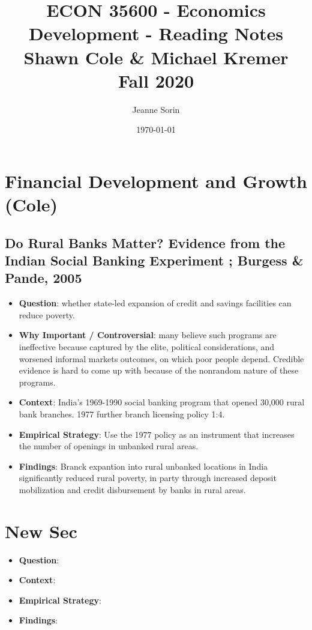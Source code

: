 \documentclass[10pt, final]{article}
\title{ECON 35600 - Economics Development - Reading Notes \\ Shawn Cole \& Michael Kremer \\ Fall 2020}
\author{Jeanne Sorin}
\date{\today}
\begin{document}
\newcommand{\hatxi}{\hat{\mathbf{x}}^i}
\newcommand{\tildexi}{\tilde{\mathbf{x}}^i}

\maketitle

\section{Financial Development and Growth (Cole)} %
\label{sec:financial_development_and_growth_}

\subsection{Do Rural Banks Matter? Evidence from the Indian Social Banking Experiment ; Burgess \& Pande, 2005} %
\label{sub:do_rural_banks_matter_evidence_from_the_indian_social_banking_experiment_burgess_&_pande_2005}

\begin{itemize}
	\item \textbf{Question}: whether state-led expansion of credit and savings facilities can reduce poverty.
	\item \textbf{Why Important / Controversial}: many believe such programs are ineffective because captured by the elite, political considerations, and worsened informal markets outcomes, on which poor people depend. Credible evidence is hard to come up with because of the nonrandom nature of these programs.
	\item \textbf{Context}: India's 1969-1990 social banking program that opened 30,000 rural bank branches. 1977 further branch licensing policy 1:4.
	\item \textbf{Empirical Strategy}: Use the 1977 policy as an instrument that increases the number of openings in unbanked rural areas.
	\item \textbf{Findings}: Branck expantion into rural unbanked locations in India significantly reduced rural poverty, in party through increased deposit mobilization and credit disbursement by banks in rural areas.
\end{itemize}



\section{New Sec} %
\label{sec:new_sec}
\begin{itemize}
	\item \textbf{Question}:
	\item \textbf{Context}:
	\item \textbf{Empirical Strategy}:
	\item \textbf{Findings}:
\end{itemize}
\end{document}
